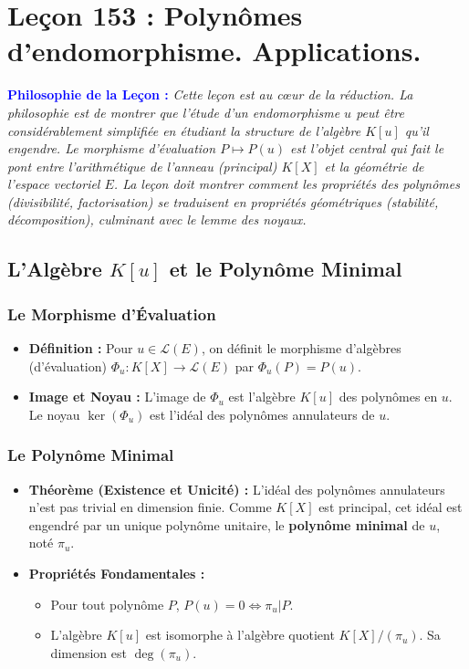 \documentclass[12pt, a4paper, parskip=full]{report}
\theoremstyle{agregstyle}
\newenvironment{philosophie}
  {\par\medskip\noindent\begin{oframed}\noindent\textbf{\textcolor{blue}{Philosophie de la Leçon :}}\itshape}
  {\end{oframed}\par\medskip}
\begin{document}
\newpage
\chapter{Leçon 153 : Polynômes d'endomorphisme. Applications.}

\begin{philosophie}
    Cette leçon est au cœur de la réduction. La philosophie est de montrer que l'étude d'un endomorphisme $u$ peut être considérablement simplifiée en étudiant la structure de l'algèbre $K[u]$ qu'il engendre. Le morphisme d'évaluation $P \mapsto P(u)$ est l'objet central qui fait le pont entre l'arithmétique de l'anneau (principal) $K[X]$ et la géométrie de l'espace vectoriel $E$. La leçon doit montrer comment les propriétés des polynômes (divisibilité, factorisation) se traduisent en propriétés géométriques (stabilité, décomposition), culminant avec le lemme des noyaux.
\end{philosophie}

\section{L'Algèbre $K[u]$ et le Polynôme Minimal}

\subsection{Le Morphisme d'Évaluation}
\begin{itemize}
    \item \textbf{Définition :} Pour $u \in \mathcal{L}(E)$, on définit le morphisme d'algèbres (d'évaluation) $\Phi_u: K[X] \to \mathcal{L}(E)$ par $\Phi_u(P) = P(u)$.
    \item \textbf{Image et Noyau :} L'image de $\Phi_u$ est l'algèbre $K[u]$ des polynômes en $u$. Le noyau $\ker(\Phi_u)$ est l'idéal des polynômes annulateurs de $u$.
\end{itemize}

\subsection{Le Polynôme Minimal}
\begin{itemize}
    \item \textbf{Théorème (Existence et Unicité) :} L'idéal des polynômes annulateurs n'est pas trivial en dimension finie. Comme $K[X]$ est principal, cet idéal est engendré par un unique polynôme unitaire, le \textbf{polynôme minimal} de $u$, noté $\pi_u$.
    \item \textbf{Propriétés Fondamentales :}
        \begin{itemize}
            \item Pour tout polynôme $P$, $P(u)=0 \iff \pi_u | P$.
            \item L'algèbre $K[u]$ est isomorphe à l'algèbre quotient $K[X]/(\pi_u)$. Sa dimension est $\deg(\pi_u)$.
        \end{itemize}
\end{itemize}
\end{document}
